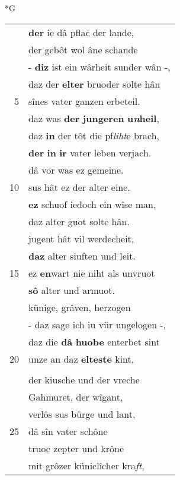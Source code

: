 \documentclass[8pt,a4paper,notitlepage]{article}
\begin{document}
\newpage
\begin{table}[ht]
\begin{minipage}[t]{0.5\linewidth}
\small
\begin{center}*G
\end{center}
\begin{tabular}{rl}
 & \textbf{der} ie dâ pflac der lande,\\ 
 & der gebôt wol âne schande\\ 
 & - \textbf{diz} ist ein wârheit sunder wân -,\\ 
 & daz der \textbf{elter} bruoder solte hân\\ 
5 & sînes vater ganzen erbeteil.\\ 
 & daz was \textbf{der} \textbf{jungeren} \textbf{u\textit{n}heil},\\ 
 & daz \textbf{in} der tôt die pf\textit{liht}e brach,\\ 
 & \textbf{der} \textbf{in} \textbf{ir} vater leben verjach.\\ 
 & dâ vor was ez gemeine.\\ 
10 & sus hât ez der alter eine.\\ 
 & \textbf{ez} schuof iedoch ein wîse man,\\ 
 & daz alter guot solte hân.\\ 
 & jugent hât vil werdecheit,\\ 
 & \textbf{daz} alter siuften und leit.\\ 
15 & ez \textbf{en}wart nie niht als unvruot\\ 
 & \textbf{sô} alter und armuot.\\ 
 & künige, grâven, herzogen\\ 
 & - daz sage ich iu vür ungelogen -,\\ 
 & daz die \textbf{dâ} \textbf{huobe} enterbet sint\\ 
20 & unze an daz \textbf{elteste} kint,\\ 
 & \textbf{\begin{large}D\end{large}az} \textbf{ist} ein vremdiu zeche.\\ 
 & der kiusche und der vreche\\ 
 & Gahmuret, der wîgant,\\ 
 & verlôs sus bürge und lant,\\ 
25 & dâ sîn vater schône\\ 
 & truoc zepter und krône\\ 
 & mit grôzer küniclîcher kra\textit{ft},\\ 

\end{tabular}
\end{minipage}
\end{table}
\end{document}
